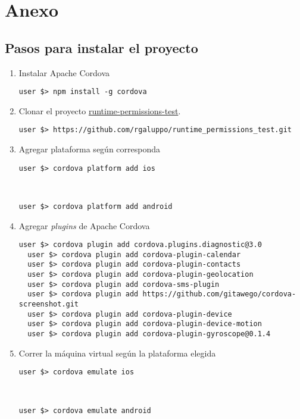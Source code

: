 \chapter*{Anexo}
\section*{Pasos para instalar el proyecto}
\begin{enumerate}
    \item Instalar Apache Cordova
        \begin{lstlisting}[style=DOS]
  user $> npm install -g cordova
        \end{lstlisting}
    \item Clonar el proyecto \href{https://github.com/rgaluppo/runtime_permissions_test}{runtime-permissions-test}.
    \begin{lstlisting}[style=DOS]
  user $> https://github.com/rgaluppo/runtime_permissions_test.git
  \end{lstlisting}
    \item Agregar plataforma según corresponda
        \begin{lstlisting}[style=DOS]
  user $> cordova platform add ios
        \end{lstlisting}
\\
        \begin{lstlisting}[style=DOS]
  user $> cordova platform add android
        \end{lstlisting}
    \item Agregar \emph{plugins} de Apache Cordova
        \begin{lstlisting}[style=DOS]
  user $> cordova plugin add cordova.plugins.diagnostic@3.0
  user $> cordova plugin add cordova-plugin-calendar
  user $> cordova plugin add cordova-plugin-contacts
  user $> cordova plugin add cordova-plugin-geolocation
  user $> cordova plugin add cordova-sms-plugin
  user $> cordova plugin add https://github.com/gitawego/cordova-screenshot.git
  user $> cordova plugin add cordova-plugin-device
  user $> cordova plugin add cordova-plugin-device-motion
  user $> cordova plugin add cordova-plugin-gyroscope@0.1.4
        \end{lstlisting}
    \item Correr la máquina virtual según la plataforma elegida
        \begin{lstlisting}[style=DOS]
  user $> cordova emulate ios
        \end{lstlisting}
\\
        \begin{lstlisting}[style=DOS]
  user $> cordova emulate android
        \end{lstlisting}
\end{enumerate}
